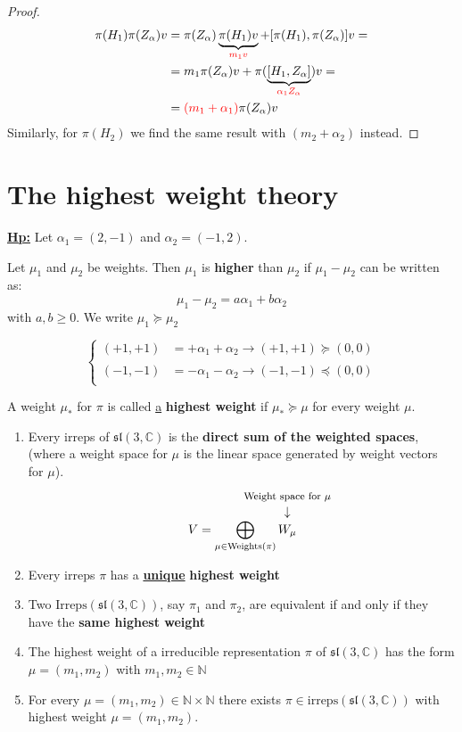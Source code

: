 \documentclass[../main.tex]{subfiles}
\begin{document}
\begin{proof}
\begin{align*}
    \pi(H_1)\pi(Z_\alpha)v&=\pi(Z_\alpha)\underbrace{\pi(H_1)v}_{{\color{red}m_1v}}+[\pi(H_1),\pi(Z_\alpha)]v=\\
    &=m_1\pi(Z_\alpha)v+\pi(\underbrace{[H_1,Z_\alpha]}_{{\color{red}\alpha_1Z_\alpha}})v=\\
    &={\color{red}(m_1+\alpha_1)}\pi(Z_\alpha)v
\end{align*}
Similarly, for $\pi(H_2)$ we find the same result with $(m_2+\alpha_2)$ instead.
\end{proof}
\section{The highest weight theory}
\underline{\textbf{Hp:}} Let $\alpha_1=(2,-1)$ and $\alpha_2=(-1,2)$.
\begin{definition}
Let $\mu_1$ and $\mu_2$ be weights. Then $\mu_1$ is \textbf{higher} than $\mu_2$ if $\mu_1-\mu_2$ can be written as:
\[
\mu_1-\mu_2=a\alpha_1+b\alpha_2
\]
with $a,b\ge0$. We write $\mu_1\succeq\mu_2$
\end{definition}
\begin{example}
\[
\left\{
\begin{aligned}
(+1,+1)&=+\alpha_1+\alpha_2\xrightarrow[]{}(+1,+1)\succeq(0,0)\\
(-1,-1)&=-\alpha_1-\alpha_2\xrightarrow[]{}(-1,-1)\preceq(0,0)
\end{aligned}
\right.
\]
\end{example}
\begin{definition}
A weight $\mu_*$ for $\pi$ is called \underline{a} \textbf{highest weight} if $\mu_*\succeq\mu$ for every weight $\mu$.
\end{definition}
\begin{theorem}
\begin{enumerate}
    \item Every irreps of $\mathfrak{sl}(3,\mathbb{C})$ is the \textbf{direct sum of the weighted spaces}, (where a weight space for $\mu$ is the linear space generated by weight vectors for $\mu$).
    \[
    V=\bigoplus_{\mu\in\textrm{Weights}(\pi)}\overset{\mathclap{\tikz \node {$\downarrow$} node [above=1.25ex] {\footnotesize Weight space for $\mu$};}}{W_\mu}
    \]
    \item Every irreps $\pi$ has a \underline{\textbf{unique}} \textbf{highest weight}
    \item Two $\textrm{Irreps}(\mathfrak{sl}(3,\mathbb{C}))$, say $\pi_1$ and $\pi_2$, are equivalent if and only if they have the \textbf{same highest weight}
    \item The highest weight of a irreducible representation $\pi$ of $\mathfrak{sl}(3,\mathbb{C})$ has the form {\color{red}$\mu=(m_1,m_2)$} with {\color{red}$m_1,m_2\in\mathbb{N}$}
    \item For every $\mu=(m_1,m_2)\in\mathbb{N}\times\mathbb{N}$ there exists $\pi\in\textrm{irreps}(\mathfrak{sl}(3,\mathbb{C}))$ with highest weight $\mu=(m_1,m_2)$.
\end{enumerate}
\end{theorem}
\end{document}
